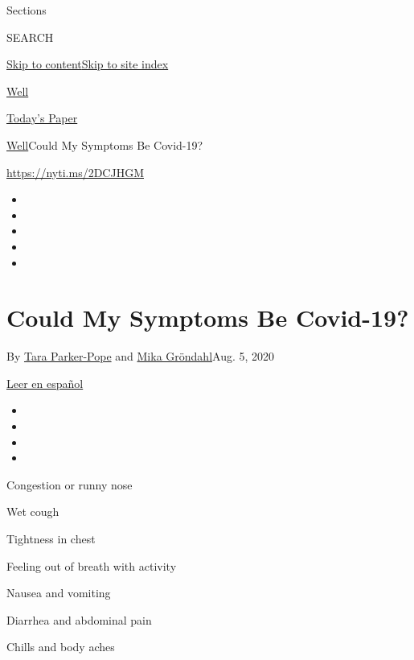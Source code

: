 Sections

SEARCH

\protect\hyperlink{site-content}{Skip to
content}\protect\hyperlink{site-index}{Skip to site index}

\href{https://www.nytimes3xbfgragh.onion/section/well}{Well}

\href{https://myaccount.nytimes3xbfgragh.onion/auth/login?response_type=cookie\&client_id=vi}{}

\href{https://www.nytimes3xbfgragh.onion/section/todayspaper}{Today's
Paper}

\href{/section/well}{Well}\textbar{}Could My Symptoms Be Covid-19?

\url{https://nyti.ms/2DCJHGM}

\begin{itemize}
\item
\item
\item
\item
\item
\end{itemize}

\hypertarget{could-my-symptoms-be-covid-19}{%
\section{Could My Symptoms Be
Covid-19?}\label{could-my-symptoms-be-covid-19}}

By \href{https://www.nytimes3xbfgragh.onion/by/tara-parker-pope}{Tara
Parker-Pope} and
\href{https://www.nytimes3xbfgragh.onion/by/mika-grondahl}{Mika
Gröndahl}Aug. 5, 2020

\href{https://www.nytimes3xbfgragh.onion/es/interactive/2020/08/06/espanol/ciencia-y-tecnologia/tengo-covid-19-sintomas.html}{Leer
en español}

\begin{itemize}
\item
\item
\item
\item
\end{itemize}

Congestion or runny nose

Wet cough

Tightness in chest

Feeling out of breath with activity

Nausea and vomiting

Diarrhea and abdominal pain

Chills and body aches

